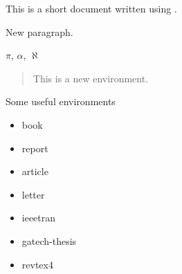 \documentclass{article}
\begin{document}
This         
 is 
 a 
 short document written using \LaTeXe.
 
New paragraph.

$\pi$, $\alpha$, $\aleph$

\begin{quotation}
This is a new environment.
\end{quotation}

\begin{table}[!b]
\caption{Some useful environments}
\begin{itemize}
    \item book
    \item report
    \item article
    \item letter
    \item ieeetran
    \item gatech-thesis
    \item revtex4
\end{itemize}
\end{table}
\end{document}
